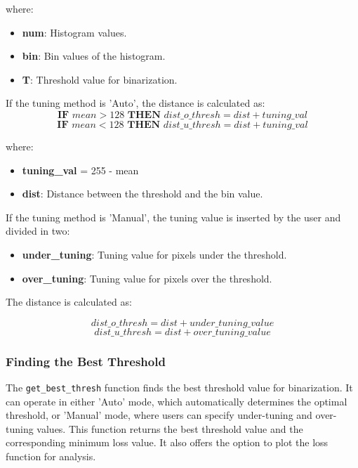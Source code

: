 \begin{multicols}{2}
where:
\begin{itemize}
    \item \textbf{num}: Histogram values.
    \item \textbf{bin}: Bin values of the histogram.
    \item \textbf{T}: Threshold value for binarization.
\end{itemize}
\vspace{0.4cm}
\noindent
If the tuning method is 'Auto', the distance is calculated as:
$$
    \textbf{IF } {{mean}} > 128 \textbf{ THEN } {{dist\_o\_thresh}} = {{dist}} + {{tuning\_val}}
$$
$$
    \textbf{IF } {{mean}} < 128 \textbf{ THEN } {{dist\_u\_thresh}} = {{dist}} + {{tuning\_val}}
$$

where:
\begin{itemize}
    \item \textbf{{tuning\_val}} = 255 - mean
    \item \textbf{dist}: Distance between the threshold and the bin value.
\end{itemize}

\vspace{0.4cm}
\noindent
If the tuning method is 'Manual', the tuning value is inserted by the user and divided in two:
\begin{itemize}
    \item \textbf{under\_tuning}: Tuning value for pixels under the threshold.
    \item \textbf{over\_tuning}: Tuning value for pixels over the threshold.
\end{itemize}

\noindent
The distance is calculated as:

$$
    {{dist\_o\_thresh}} = {{dist}} + {{under\_tuning\_value}}
$$
$$
    {{dist\_u\_thresh}} = {{dist}} + {{over\_tuning\_value}}
$$

\subsubsection{Finding the Best Threshold}

The \texttt{get\_best\_thresh} function finds the best threshold value for binarization. It can operate in either 'Auto' mode, which automatically determines the optimal threshold, or 'Manual' mode, where users can specify under-tuning and over-tuning values. This function returns the best threshold value and the corresponding minimum loss value. It also offers the option to plot the loss function for analysis.


\end{multicols}
